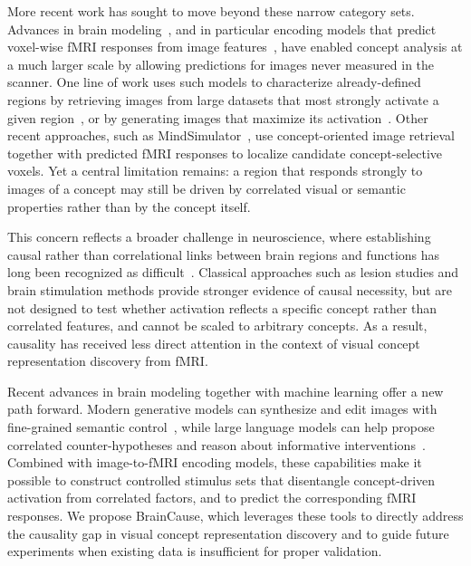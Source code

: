 \documentclass{llmxive}
\begin{document}
More recent work has sought to move beyond these narrow category sets. Advances in brain modeling~\cite{Wasserman2026NoShared, Yamada2015Converter, Scotti2024MindEye2, Beliy2025BrainIT,ratan2021computational}, and in particular encoding models that predict voxel-wise fMRI responses from image features~\cite{Kay08, Naselaris11, Beliy2024Wisdom, adeli2025transformer}, have enabled concept analysis at a much larger scale by allowing predictions for images never measured in the scanner. One line of work uses such models to characterize already-defined regions by retrieving images from large datasets that most strongly activate a given region~\cite{hwang2025silico}, or by generating images that maximize its activation~\cite{neurogen, braindiffusion}. Other recent approaches, such as MindSimulator~\cite{Bao2025MindSimulator}, use concept-oriented image retrieval together with predicted fMRI responses to localize candidate concept-selective voxels. Yet a central limitation remains: a region that responds strongly to images of a concept may still be driven by correlated visual or semantic properties rather than by the concept itself.

This concern reflects a broader challenge in neuroscience, where establishing causal rather than correlational links between brain regions and functions has long been recognized as difficult~\cite{bielczyk2019disentangling, siddiqi2022causal}. Classical approaches such as lesion studies and brain stimulation methods provide stronger evidence of causal necessity, but are not designed to test whether activation reflects a specific concept rather than correlated features, and cannot be scaled to arbitrary concepts. As a result, causality has received less direct attention in the context of visual concept representation discovery from fMRI.

Recent advances in brain modeling together with machine learning offer a new path forward. Modern generative models can synthesize and edit images with fine-grained semantic control~\cite{rombach2022high, brooks2023instructpix2pix, wasserman2025paint, labs2025flux1kontextflowmatching}, while large language models can help propose correlated counter-hypotheses and reason about informative interventions~\cite{kiciman2023causal, alkan2025survey, zhou2024hypothesis}. 
Combined with image-to-fMRI encoding models, these capabilities make it possible to construct controlled stimulus sets that disentangle concept-driven activation from correlated factors, and to predict the corresponding fMRI responses. We propose BrainCause, which leverages these tools to directly address the causality gap in visual concept representation discovery and to guide future experiments when existing data is insufficient for proper validation.
\end{document}
